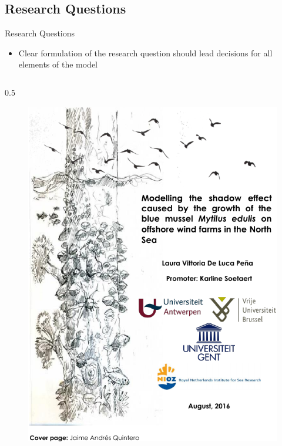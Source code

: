 \documentclass[final,xcolor=dvipsnames]{beamer}
\begin{document}
\subsection{Research Questions}

\begin{frame}
\begin{block}{Research Questions}
\begin{itemize}
    \item Clear formulation of the research question should lead decisions for all elements of the model 
\end{itemize}
\end{block}
\end{frame}

\begin{frame}
\begin{exampleblock}{}
\begin{columns}
\begin{column}{0.5\framewidth}
\begin{figure}
    \centering
    \includegraphics[width=.9\columnwidth]{./Figs/Context.png}

\end{figure}
\end{column}
\end{columns}
\end{exampleblock}
\end{frame}
\end{document}
